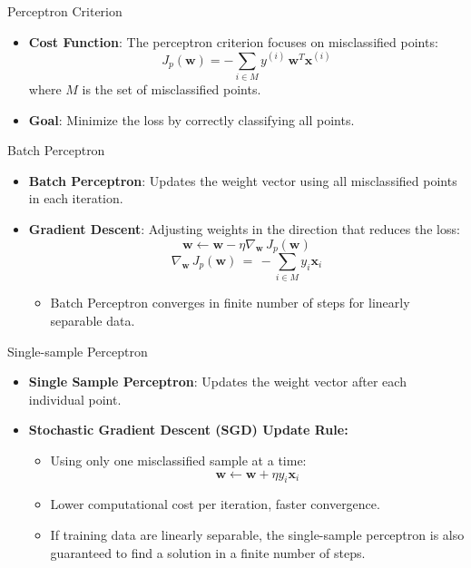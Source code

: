 \documentclass[serif, aspectratio=169]{beamer}
\begin{document}
\begin{frame}{Perceptron Criterion}
    \begin{itemize}\itemsep1.2em
        \item \textbf{Cost Function}:
        The perceptron criterion focuses on misclassified points:
        \[
        J_p(\mathbf{w}) = - \sum_{i \in M} y^{(i)} \, \mathbf{w}^T \mathbf{x}^{(i)}
        \]
        where \( M \) is the set of misclassified points.
        \item \textbf{Goal}:
        Minimize the loss by correctly classifying all points.
    \end{itemize}
\end{frame}


\begin{frame}{Batch Perceptron}
    \begin{itemize}\itemsep1.5em
        \item \justifying \textbf{Batch Perceptron}:
        Updates the weight vector using all misclassified points in each iteration.
        \item \justifying \textbf{Gradient Descent}:
        Adjusting weights in the direction that reduces the loss:
        \[
        \mathbf{w} \leftarrow \mathbf{w} - \eta \nabla_\mathbf{w} \, J_p(\mathbf{w})
        \]
        \[
        \nabla_\mathbf{w} \, J_p(\mathbf{w}) \, = \, - \sum_{i \in M} y_i \mathbf{x}_i
        \]
        \begin{itemize}
            \item Batch Perceptron converges in finite number of steps for linearly separable data.
        \end{itemize}
    \end{itemize}
\end{frame}

\begin{frame}{Single-sample Perceptron}
    \begin{itemize}\itemsep1.5em
        \item \justifying \textbf{Single Sample Perceptron}: Updates the weight vector after each individual point.
        \item \textbf{Stochastic Gradient Descent (SGD) Update Rule:}
        \smallskip
        \begin{itemize}\itemsep1em
            \item Using only one misclassified sample at a time:
            \[
            \mathbf{w} \leftarrow \mathbf{w} + \eta y_i \mathbf{x}_i
            \]
            \item Lower computational cost per iteration, faster convergence.
            \item \justifying If training data are linearly separable, the single-sample perceptron is also guaranteed to find a solution in a finite number of steps.
        \end{itemize}
    \end{itemize}
\end{frame}
\end{document}
